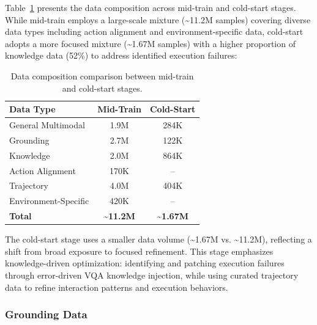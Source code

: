 Table~\ref{tab:data-comparison} presents the data composition across mid-train and cold-start stages. While mid-train employs a large-scale mixture (\textasciitilde11.2M samples) covering diverse data types including action alignment and environment-specific data, cold-start adopts a more focused mixture (\textasciitilde1.67M samples) with a higher proportion of knowledge data (52\%) to address identified execution failures:
\begin{table}[h]
\centering
\caption{Data composition comparison between mid-train and cold-start stages.}
\label{tab:data-comparison}
\begin{tabular}{lcc}
\toprule
\textbf{Data Type} & \textbf{Mid-Train} & \textbf{Cold-Start} \\
\midrule
General Multimodal & 1.9M & 284K \\
Grounding & 2.7M & 122K \\
Knowledge & 2.0M & 864K \\
Action Alignment & 170K & -- \\
Trajectory & 4.0M & 404K \\
Environment-Specific & 420K & -- \\
\midrule
\textbf{Total} & \textbf{\textasciitilde11.2M} & \textbf{\textasciitilde1.67M} \\
\bottomrule
\end{tabular}
\end{table}

The cold-start stage uses a smaller data volume (\textasciitilde1.67M vs. \textasciitilde11.2M), reflecting a shift from broad exposure to focused refinement. 
This stage emphasizes knowledge-driven optimization: identifying and patching execution failures through error-driven VQA knowledge injection, while using curated trajectory data to refine interaction patterns and execution behaviors.



\subsubsection{Grounding Data}

